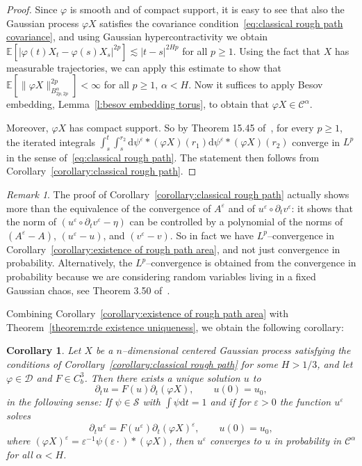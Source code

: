 \documentclass[a4paper,11pt]{article}
\newcommand{\mathd}{\mathrm{d}}
\newtheorem{corollary}[theorem]{Corollary}
\theoremstyle{remark}
\newtheorem{remark}[theorem]{Remark}
\newcommand{\E}{\mathbb{E}}
\newcommand{\CC}{\ensuremath{\mathscr{C}}}
\newcommand{\CD}{\ensuremath{\mathscr{D}}}
\newcommand{\CS}{\ensuremath{\mathscr{S}}}
\newcommand{\reso}{\,\mathord{\circ}\,}
\begin{document}
\begin{proof}
  Since $\varphi$ is smooth and of compact support, it is easy to see that
  also the Gaussian process $\varphi X$ satisfies the covariance
  condition~{\eqref{eq:classical rough path covariance}}, and using Gaussian hypercontractivity we obtain $\mathbb{E} [ | \varphi(t)X_{t} -\varphi(s)X_{s} |^{2p} ] \lesssim | t-s |^{2Hp}$ for all $p \geqslant 1$. Using the fact that $X$ has measurable trajectories, we can apply this estimate to show that $\E[\| \varphi X\|_{B^\alpha_{2p,2p}}^{2p}] < \infty$ for all $p \geqslant 1$, $\alpha < H$. Now it suffices to apply Besov embedding, Lemma~\ref{l:besov embedding torus}, to obtain that $\varphi X \in \CC^\alpha$.

  Moreover, $\varphi X$ has compact support. So by Theorem 15.45 of~{\cite{Friz2010}}, for every $p \geqslant 1$, the
  iterated integrals $\int_{s}^{t} \int_{s}^{r_{2}} \mathd \psi^{\varepsilon} \ast ( \varphi X ) ( r_{1} ) \mathd \psi^{\varepsilon} \ast ( \varphi X ) ( r_{2} )$ converge in $L^{p}$ in the sense of~{\eqref{eq:classical rough path}}. The statement then follows from Corollary~\ref{corollary:classical rough path}.
\end{proof}

\begin{remark}
  The proof of Corollary~\ref{corollary:classical rough path} actually shows
  more than the equivalence of the convergence of $A^{\varepsilon}$ and of
  $u^{\varepsilon} \reso \partial_{t} v^{\varepsilon}$: it shows that the norm
  of $( u^{\varepsilon} \reso \partial_{t} v^{\varepsilon} - \eta )$ can be
  controlled by a polynomial of the norms of $( A^{\varepsilon} -A )$, $(u^{\varepsilon} -u )$, and $(v^{\varepsilon} -v)$. So in fact we
  have $L^{p}$--convergence in Corollary~\ref{corollary:existence of rough path area}, and not just convergence in probability. Alternatively, the $L^p$--convergence is obtained from the convergence in probability because we are considering random variables living in a fixed Gaussian chaos, see Theorem 3.50 of~\cite{Janson1997}.
\end{remark}

Combining Corollary~\ref{corollary:existence of rough path area} with Theorem~\ref{theorem:rde existence uniqueness}, we obtain the following corollary:

\begin{corollary}
  Let $X$ be a $n$--dimensional centered Gaussian process satisfying the conditions of Corollary~\ref{corollary:classical rough path} for some $H > 1/3$, and let $\varphi \in \CD$ and $F \in C^3_b$. Then there exists a unique solution $u$ to
  \[
     \partial_t u = F(u) \partial_t (\varphi X), \qquad u(0) = u_0,
  \]
  in the following sense: If $\psi \in \CS$ with $\int \psi \mathd t=1$ and if for $\varepsilon > 0$ the function $u^\varepsilon$ solves
  \[
     \partial_t u^\varepsilon = F(u^\varepsilon) \partial_t (\varphi X)^\varepsilon, \qquad u(0) = u_0,
  \]
  where $(\varphi X)^\varepsilon = \varepsilon^{-1} \psi(\varepsilon \cdot) \ast (\varphi X)$, then $u^\varepsilon$ converges to $u$ in probability in $\CC^\alpha$ for all $\alpha < H$.
\end{corollary}
\end{document}
